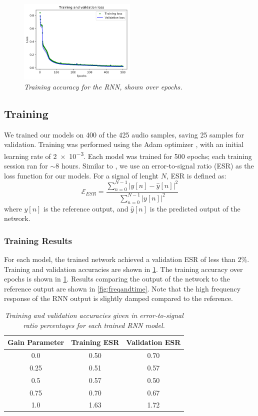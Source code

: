 \documentclass[twoside,a4paper]{article}
\begin{document}
\begin{figure}
    \centering
    \includegraphics[width=0.5\textwidth]{Training.png}
    \caption{\label{fig:training} {\it Training accuracy
        for the RNN, shown over epochs.}}
\end{figure}
%

\subsection{Training}
We trained our models on 400 of the 425 audio samples, saving 25
samples for validation. Training was performed using the Adam
optimizer \cite{Kingma2015AdamAM}, with an initial learning rate
of \num{2e-3}. Each model was trained for 500 epochs; each training
session ran for $\sim 8$ hours. Similar to \cite{VArnn}, we use an
error-to-signal ratio (ESR) as the loss function for our models. For
a signal of lenght $N$, ESR is defined as:
\begin{equation}
    \mathcal{E}_{ESR} = \frac{\sum_{n=0}^{N-1} |y[n] - \hat{y}[n]|^2}{\sum_{n=0}^{N-1} |y[n]|^2}
\end{equation}
%
where $y[n]$ is the reference output, and $\hat{y}[n]$ is the predicted
output of the network.

\subsubsection{Training Results}
For each model, the trained network achieved a validation ESR of less than
$2\%$. Training and validation accuracies are shown in \cref{table:train}.
The training accuracy over epochs is shown in \cref{fig:training}. Results
comparing the output of the network to the reference output are shown in
\cref{fig:freqandtime}. Note that the high frequency response of the RNN
output is slightly damped compared to the reference.
%
\begin{table}[h!]
    \centering
     \begin{tabular}{||c | c | c||} 
     \hline
     Gain Parameter & Training ESR & Validation ESR \\
     \hline\hline
     0.0  & 0.50 & 0.70 \\
     0.25 & 0.51 & 0.57 \\
     0.5  & 0.57 & 0.50 \\
     0.75 & 0.70 & 0.67 \\
     1.0  & 1.63 & 1.72 \\
     \hline
     \end{tabular}
    \caption{\label{table:train} {\it Training and validation
        accuracies given in error-to-signal ratio percentages
        for each trained RNN model.}}
\end{table}
\end{document}
